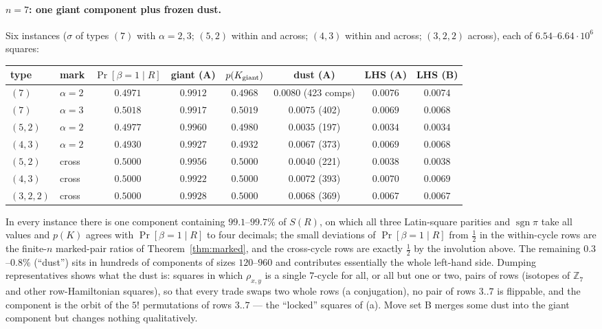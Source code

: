 \paragraph{$n=7$: one giant component plus frozen dust.}  Six
instances ($\sigma$ of types $(7)$ with $\alpha=2,3$; $(5,2)$ within and
across; $(4,3)$ within and across; $(3,2,2)$ across), each of
$6.54$--$6.64\cdot10^6$ squares:
\begin{center}\small
\begin{tabular}{llcccccc}
type & mark & $\Pr[\beta{=}1\mid R]$ & giant (A) & $p(K_{\rm giant})$ & dust (A) & LHS (A) & LHS (B)\\\hline
$(7)$ & $\alpha=2$ & $0.4971$ & $0.9912$ & $0.4968$ & $0.0080$ (423 comps) & $0.0076$ & $0.0074$\\
$(7)$ & $\alpha=3$ & $0.5018$ & $0.9917$ & $0.5019$ & $0.0075$ (402) & $0.0069$ & $0.0068$\\
$(5,2)$ & $\alpha=2$ & $0.4977$ & $0.9960$ & $0.4980$ & $0.0035$ (197) & $0.0034$ & $0.0034$\\
$(4,3)$ & $\alpha=2$ & $0.4930$ & $0.9927$ & $0.4932$ & $0.0067$ (373) & $0.0069$ & $0.0068$\\
$(5,2)$ & cross & $0.5000$ & $0.9956$ & $0.5000$ & $0.0040$ (221) & $0.0038$ & $0.0038$\\
$(4,3)$ & cross & $0.5000$ & $0.9922$ & $0.5000$ & $0.0072$ (393) & $0.0070$ & $0.0069$\\
$(3,2,2)$ & cross & $0.5000$ & $0.9928$ & $0.5000$ & $0.0068$ (369) & $0.0067$ & $0.0067$
\end{tabular}
\end{center}
In every instance there is one component containing $99.1$--$99.7\%$ of
$S(R)$, on which all three Latin-square parities and $\operatorname{sgn}\pi$
take all values and $p(K)$ agrees with $\Pr[\beta=1\mid R]$ to four
decimals; the small deviations of $\Pr[\beta=1\mid R]$ from $\tfrac12$
in the within-cycle rows are the finite-$n$ marked-pair ratios of
Theorem~\ref{thm:marked}, and the cross-cycle rows are exactly $\tfrac12$
by the involution above.  The remaining $0.3$--$0.8\%$ (``dust'') sits in
hundreds of components of sizes $120$--$960$ and contributes essentially
the whole left-hand side.  Dumping representatives shows what the dust is:
squares in which $\rho_{x,y}$ is a single $7$-cycle for all, or all but
one or two, pairs of rows (isotopes of $\mathbb Z_7$ and other
row-Hamiltonian squares), so that every trade swaps two whole rows (a
conjugation), no pair of rows $3..7$ is flippable, and the component is
the orbit of the $5!$ permutations of rows $3..7$ --- the ``locked''
squares of (a).  Move set B merges some dust into the giant component
but changes nothing qualitatively.

